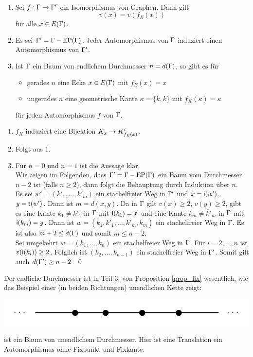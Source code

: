 \documentclass[a4paper, 12pt, twoside]{article}
\begin{document}
\PROP\
\label{prop_fix}
\begin{enumerate}
\item Sei $f:\Gamma\rightarrow\Gamma'$ ein Isomorphismus von Graphen.
Dann gilt
\[
v(x) = v(f_E(x))
\]
für alle $x\in E(\Gamma)$.
\item Es sei $\Gamma'=\Gamma-\mathrm{EP}(\Gamma)$. Jeder Automorphismus von $\Gamma$
induziert einen Automorphismus von $\Gamma'$.
\item Ist $\Gamma$ ein Baum von endlichem Durchmesser $n=d(\Gamma)$,
so gibt es für
	\begin{itemize}
	\item gerades $n$ eine Ecke $x\in E(\Gamma)$ mit $f_E(x)=x$
	\item ungerades $n$ eine geometrische Kante $\kappa=\{k,\bar{k}\}$
	mit $f_K(\kappa)=\kappa$
	\end{itemize}
für jeden Automorphismus $f$ von $\Gamma$.
\end{enumerate}
\bew 
\begin{enumerate}
\item $f_K$ induziert eine Bijektion $K_x\rightarrow K'_{f_E(x)}$.
\item Folgt aus 1.
\item Für $n=0$ und $n=1$ ist die Aussage klar.\\
Wir zeigen im Folgenden, dass $\Gamma'=\Gamma-\mathrm{EP}(\Gamma)$ ein Baum vom
Durchmesser $n-2$ ist (falls $n\geq 2$), dann folgt die
Behauptung durch Induktion über $n$.\\
Es sei $w'=(k'_1,\ldots,k'_m)$ ein stachelfreier Weg in $\Gamma'$
und $x=\mathsf{i}(w')$, $y=\mathsf{t}(w')$. Dann ist $m=d(x,y)$.
Da in $\Gamma$ gilt $v(x)\geq 2$, $v(y)\geq 2$, gibt es eine Kante
$k_1\neq k'_1$ in $\Gamma$ mit $\mathsf{i}(k_1)=x$ und eine Kante
$k_m\neq \bar{k}'_m$ in $\Gamma$ mit $\mathsf{i}(k_m)=y$.
Dann ist $w=(\bar{k}_1,k'_1,\ldots,k'_m,k_m)$ ein stachelfreier Weg
in $\Gamma$. Es ist also $m+2\leq d(\Gamma)$ und somit $m\leq n-2$.\\
Sei umgekehrt $w=(k_1,\ldots,k_n)$ ein stachelfreier Weg in $\Gamma$.
Für $i=2,\ldots,n$ ist $v(\mathsf{i}(k_i))\geq 2$. Folglich ist
$(k_2,\ldots,k_{n-1})$ ein stachelfreier Weg in $\Gamma'$.
Somit gilt auch $d(\Gamma')\geq n-2$.
\qed
\end{enumerate}

\BSP Der endliche Durchmesser ist in Teil 3. von Proposition
\ref{prop_fix} wesentlich, wie das Beispiel einer (in beiden
Richtungen) unendlichen Kette zeigt:
\begin{center}
	\includegraphics{grugraImages/unendldiam}
\end{center}
ist ein Baum von unendlichem Durchmesser. Hier ist eine Translation
ein Automorphismus ohne Fixpunkt und Fixkante.
\end{document}
